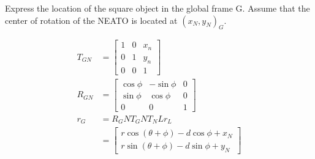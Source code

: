 Express the location of the square object in the global frame G. Assume that the center of rotation of the NEATO is located at $(x_N, y_N)_G$.

\begin{solution}
\begin{align*}
    T_{GN} &= \begin{bmatrix}
        1 & 0 & x_n \\
        0 & 1 & y_n \\
        0 & 0 & 1
    \end{bmatrix} \\
    R_{GN} &= \begin{bmatrix}
        \cos\phi & -\sin\phi & 0 \\
        \sin\phi & \cos\phi & 0 \\
        0 & 0 & 1
    \end{bmatrix} \\
    r_G &= R_GN T_GN T_NL r_L \\
    &= \begin{bmatrix}
        r \cos(\theta + \phi) - d \cos\phi + x_N \\
        r \sin(\theta + \phi) - d \sin\phi + y_N
    \end{bmatrix}
\end{align*}
\end{solution}
